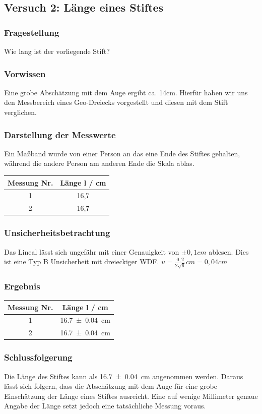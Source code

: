 \documentclass[
	a4paper,
	12pt,
	pagesize,
	ngerman
]{scrartcl}
\begin{document}
	\newpage
	\subsection{Versuch 2: Länge eines Stiftes}
	
	\subsubsection{Fragestellung}
	Wie lang ist der vorliegende Stift?
	\subsubsection{Vorwissen}
	Eine grobe Abschätzung mit dem Auge ergibt ca. 14\si{cm}. Hierfür haben wir uns den Messbereich eines Geo-Dreiecks vorgestellt und diesen mit dem Stift verglichen.
	\subsubsection{Darstellung der Messwerte}
	Ein Maßband wurde von einer Person an das eine Ende des Stiftes gehalten, während die andere Person am anderen Ende die Skala ablas.

	\begin{tabular}{| c | c |}
		\hline
		Messung Nr. & Länge l  / \si{cm}\\ \hline
		1 & 16,7\\
		2 & 16,7\\ \hline
	\end{tabular}
	\subsubsection{Unsicherheitsbetrachtung}
	Das Lineal lässt sich ungefähr mit einer Genauigkeit von $\pm 0,1 \si{cm}$ ablesen. Dies ist eine Typ B Unsicherheit mit dreieckiger WDF.
	$u=\frac{0,2}{2 \sqrt{6}} \si{cm}=0,04 \si{cm}$
	\subsubsection{Ergebnis}
	\begin{tabular}{| c | c |}
		\hline
		Messung Nr. & Länge l  / \si{cm}\\ \hline
		1 & \SI{16,7 \pm 0,04}{cm}\\
		2 & \SI{16,7 \pm 0,04}{cm}\\ \hline
	\end{tabular}
	\subsubsection{Schlussfolgerung}
	Die Länge des Stiftes kann als \SI{16,7 \pm 0,04}{cm} angenommen werden. Daraus lässt sich folgern, dass die Abschätzung mit dem Auge für eine grobe Einschätzung der Länge eines Stiftes ausreicht. Eine auf wenige Millimeter genaue Angabe der Länge setzt jedoch eine tatsächliche Messung voraus.
	\newpage
\end{document}
